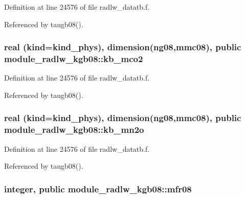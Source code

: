 Definition at line 24576 of file radlw\+\_\+datatb.\+f.



Referenced by taugb08().

\subsubsection[{\texorpdfstring{kb\+\_\+mco2}{kb_mco2}}]{\setlength{\rightskip}{0pt plus 5cm}real (kind=kind\+\_\+phys), dimension(ng08,{\bf mmc08}), public module\+\_\+radlw\+\_\+kgb08\+::kb\+\_\+mco2}\hypertarget{namespacemodule__radlw__kgb08_a9a85770aee1b88b9323d9466c1772ec4}{}\label{namespacemodule__radlw__kgb08_a9a85770aee1b88b9323d9466c1772ec4}


Definition at line 24576 of file radlw\+\_\+datatb.\+f.



Referenced by taugb08().

\subsubsection[{\texorpdfstring{kb\+\_\+mn2o}{kb_mn2o}}]{\setlength{\rightskip}{0pt plus 5cm}real (kind=kind\+\_\+phys), dimension(ng08,{\bf mmc08}), public module\+\_\+radlw\+\_\+kgb08\+::kb\+\_\+mn2o}\hypertarget{namespacemodule__radlw__kgb08_a9a8e2f789421acc307e37b03478efb4b}{}\label{namespacemodule__radlw__kgb08_a9a8e2f789421acc307e37b03478efb4b}


Definition at line 24576 of file radlw\+\_\+datatb.\+f.



Referenced by taugb08().

\subsubsection[{\texorpdfstring{mfr08}{mfr08}}]{\setlength{\rightskip}{0pt plus 5cm}integer, public module\+\_\+radlw\+\_\+kgb08\+::mfr08}\hypertarget{namespacemodule__radlw__kgb08_abfaf0cad62f8ae42564f8127198d48f0}{}\label{namespacemodule__radlw__kgb08_abfaf0cad62f8ae42564f8127198d48f0}


